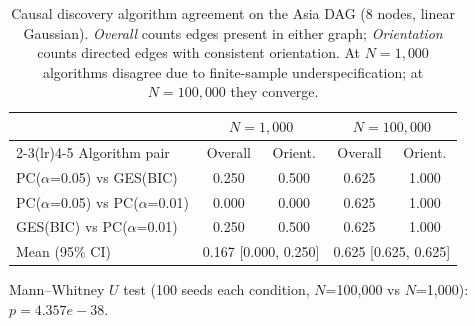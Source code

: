 \begin{table}[ht]
\centering
\caption{Causal discovery algorithm agreement on the Asia DAG (8 nodes, linear Gaussian). \emph{Overall} counts edges present in either graph; \emph{Orientation} counts directed edges with consistent orientation. At $N=1{,}000$ algorithms disagree due to finite-sample underspecification; at $N=100{,}000$ they converge.}
\label{tab:causal_discovery_agreement}
\begin{tabular}{lcccc}
\toprule
 & \multicolumn{2}{c}{$N=1{,}000$} & \multicolumn{2}{c}{$N=100{,}000$} \\
\cmidrule(lr){2-3}\cmidrule(lr){4-5}
Algorithm pair & Overall & Orient. & Overall & Orient. \\
\midrule
PC($\alpha$=0.05) vs GES(BIC) & 0.250 & 0.500 & 0.625 & 1.000 \\
PC($\alpha$=0.05) vs PC($\alpha$=0.01) & 0.000 & 0.000 & 0.625 & 1.000 \\
GES(BIC) vs PC($\alpha$=0.01) & 0.250 & 0.500 & 0.625 & 1.000 \\
\midrule
Mean (95\% CI) & \multicolumn{2}{c}{0.167 [0.000, 0.250]} & \multicolumn{2}{c}{0.625 [0.625, 0.625]} \\
\bottomrule
\end{tabular}
\vspace{2pt}
\noindent\small Mann--Whitney $U$ test (100 seeds each condition, $N$=100{,}000 vs $N$=1{,}000): $p = 4.357e-38$.
\end{table}
